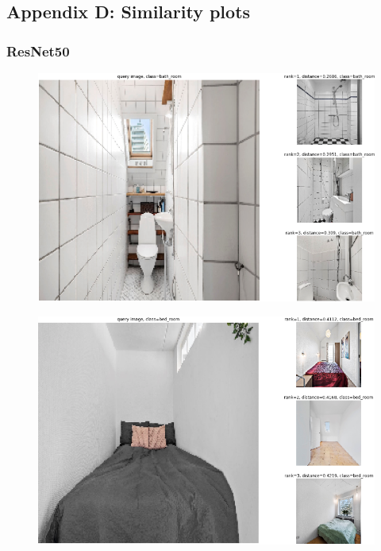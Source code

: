 \subsection*{Appendix D: Similarity plots} \label{appendix: D}
\subsubsection*{ResNet50}
\begin{figure}[H]
    \centering
    \includegraphics[width =\textwidth]{pictures/random/resnet50bathroomplot}
\end{figure}

\begin{figure}[H]
    \centering
    \includegraphics[width =\textwidth]{pictures/random/resnet50bedroomplot}
\end{figure}

